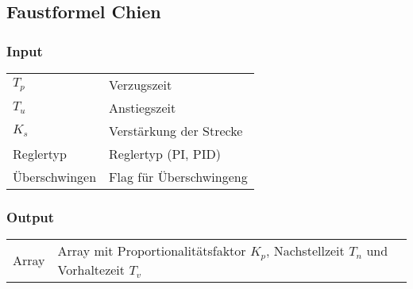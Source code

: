 %

\clearpage
\subsection{Faustformel Chien}
\label{app:algo:chien}

\subsubsection*{Input}

\begin{tabular}{p{40mm}l}
    $ T_p $             & Verzugszeit \\
    $ T_u $             & Anstiegszeit \\
    $ K_s $             & Verst\"arkung der Strecke \\
      Reglertyp         & Reglertyp (PI, PID) \\
    \"Uberschwingen     & Flag f\"ur \"Uberschwingeng %
\end{tabular}

\subsubsection*{Output}
\begin{tabular}{p{40mm}l}
    Array & \parbox[t][4em][s]{0.7\textwidth}{Array mit Proportionalit\"atsfaktor $K_p$, Nachstellzeit $T_n$ und Vorhaltezeit $T_v$}
\end{tabular}

